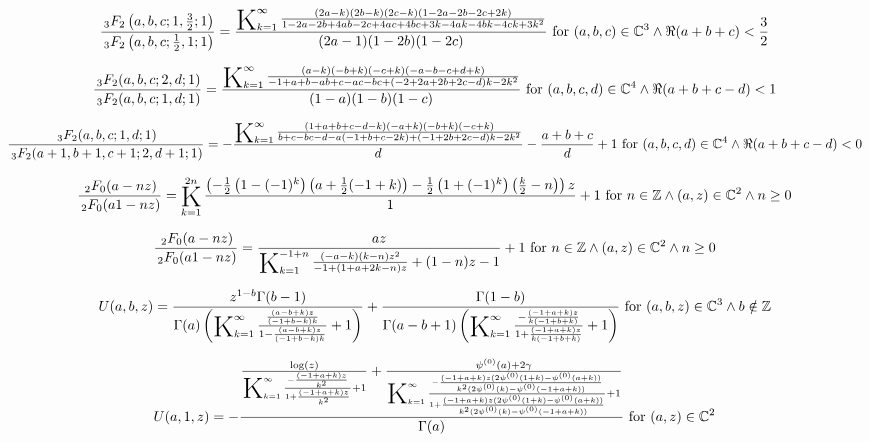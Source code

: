 \documentclass{article}
\newcommand{\bigK}{\mathop{\raisebox{-5pt}{\huge K}}}
\begin{document}
\[\frac{\, _3F_2\left(a,b,c;1,\frac{3}{2};1\right)}{\, _3F_2\left(a,b,c;\frac{1}{2},1;1\right)}=\frac{\bigK_{k=1}^{\infty}\frac{(2 a-k) (2 b-k) (2 c-k) (1-2 a-2 b-2 c+2 k)}{1-2 a-2 b+4 a b-2 c+4 a c+4 b c+3 k-4 a k-4 b k-4 c k+3 k^2}}{(2 a-1) (1-2 b) (1-2 c)}\text{ for }(a,b,c)\in \mathbb{C}^3\land \Re(a+b+c)<\frac{3}{2}\] 

\[\frac{\, _3F_2(a,b,c;2,d;1)}{\, _3F_2(a,b,c;1,d;1)}=\frac{\bigK_{k=1}^{\infty}\frac{(a-k) (-b+k) (-c+k) (-a-b-c+d+k)}{-1+a+b-a b+c-a c-b c+(-2+2 a+2 b+2 c-d) k-2 k^2}}{(1-a) (1-b) (1-c)}\text{ for }(a,b,c,d)\in \mathbb{C}^4\land \Re(a+b+c-d)<1\] 

\[\frac{\, _3F_2(a,b,c;1,d;1)}{\, _3F_2(a+1,b+1,c+1;2,d+1;1)}=-\frac{\bigK_{k=1}^{\infty}\frac{(1+a+b+c-d-k) (-a+k) (-b+k) (-c+k)}{b+c-b c-d-a (-1+b+c-2 k)+(-1+2 b+2 c-d) k-2 k^2}}{d}-\frac{a+b+c}{d}+1\text{ for }(a,b,c,d)\in \mathbb{C}^4\land \Re(a+b+c-d)<0\] 

\[\frac{\, _2F_0(a-nz)}{\, _2F_0(a1-nz)}=\bigK_{k=1}^{2 n}\frac{\left(-\frac{1}{2} \left(1-(-1)^k\right) \left(a+\frac{1}{2} (-1+k)\right)-\frac{1}{2} \left(1+(-1)^k\right) \left(\frac{k}{2}-n\right)\right) z}{1}+1\text{ for }n\in \mathbb{Z}\land (a,z)\in \mathbb{C}^2\land n\geq 0\] 

\[\frac{\, _2F_0(a-nz)}{\, _2F_0(a1-nz)}=\frac{a z}{\bigK_{k=1}^{-1+n}\frac{(-a-k) (k-n) z^2}{-1+(1+a+2 k-n) z}+(1-n) z-1}+1\text{ for }n\in \mathbb{Z}\land (a,z)\in \mathbb{C}^2\land n\geq 0\] 

\[U(a,b,z)=\frac{z^{1-b} \Gamma (b-1)}{\Gamma (a) \left(\bigK_{k=1}^{\infty}\frac{\frac{(a-b+k) z}{(-1+b-k) k}}{1-\frac{(a-b+k) z}{(-1+b-k) k}}+1\right)}+\frac{\Gamma (1-b)}{\Gamma (a-b+1) \left(\bigK_{k=1}^{\infty}\frac{-\frac{(-1+a+k) z}{k (-1+b+k)}}{1+\frac{(-1+a+k) z}{k (-1+b+k)}}+1\right)}\text{ for }(a,b,z)\in \mathbb{C}^3\land b\notin \mathbb{Z}\] 

\[U(a,1,z)=-\frac{\frac{\log (z)}{\bigK_{k=1}^{\infty}\frac{-\frac{(-1+a+k) z}{k^2}}{1+\frac{(-1+a+k) z}{k^2}}+1}+\frac{\psi ^{(0)}(a)+2 \gamma }{\bigK_{k=1}^{\infty}\frac{-\frac{(-1+a+k) z (2 \psi ^{(0)}(1+k)-\psi ^{(0)}(a+k))}{k^2 (2 \psi ^{(0)}(k)-\psi ^{(0)}(-1+a+k))}}{1+\frac{(-1+a+k) z (2 \psi ^{(0)}(1+k)-\psi ^{(0)}(a+k))}{k^2 (2 \psi ^{(0)}(k)-\psi ^{(0)}(-1+a+k))}}+1}}{\Gamma (a)}\text{ for }(a,z)\in \mathbb{C}^2\] 
\end{document}
